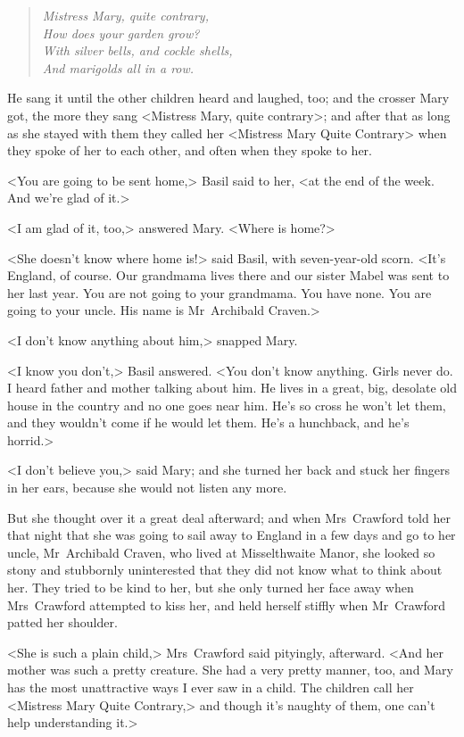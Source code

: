 \begin{verse}
	\begin{altverse}\itshape
Mistress Mary, quite contrary,\\
How does your garden grow?\\
With silver bells, and cockle shells,\\
And marigolds all in a row.
\end{altverse}
\end{verse}


He sang it until the other children heard and laughed, too; and the crosser Mary got, the more they sang <Mistress Mary, quite contrary>; and after that as long as she stayed with them they called her <Mistress Mary Quite Contrary> when they spoke of her to each other, and often when they spoke to her.

<You are going to be sent home,> Basil said to her, <at the end of the week. And we're glad of it.>

<I am glad of it, too,> answered Mary. <Where is home?>

<She doesn't know where home is!> said Basil, with seven-year-old scorn. <It's England, of course. Our grandmama lives there and our sister Mabel was sent to her last year. You are not going to your grandmama. You have none. You are going to your uncle. His name is Mr~Archibald Craven.>

<I don't know anything about him,> snapped Mary.

<I know you don't,> Basil answered. <You don't know anything. Girls never do. I heard father and mother talking about him. He lives in a great, big, desolate old house in the country and no one goes near him. He's so cross he won't let them, and they wouldn't come if he would let them. He's a hunchback, and he's horrid.>

<I don't believe you,> said Mary; and she turned her back and stuck her fingers in her ears, because she would not listen any more.

But she thought over it a great deal afterward; and when Mrs~Crawford told her that night that she was going to sail away to England in a few days and go to her uncle, Mr~Archibald Craven, who lived at Misselthwaite Manor, she looked so stony and stubbornly uninterested that they did not know what to think about her. They tried to be kind to her, but she only turned her face away when Mrs~Crawford attempted to kiss her, and held herself stiffly when Mr~Crawford patted her shoulder.

<She is such a plain child,> Mrs~Crawford said pityingly, afterward. <And her mother was such a pretty creature. She had a very pretty manner, too, and Mary has the most unattractive ways I ever saw in a child. The children call her <Mistress Mary Quite Contrary,> and though it's naughty of them, one can't help understanding it.>

